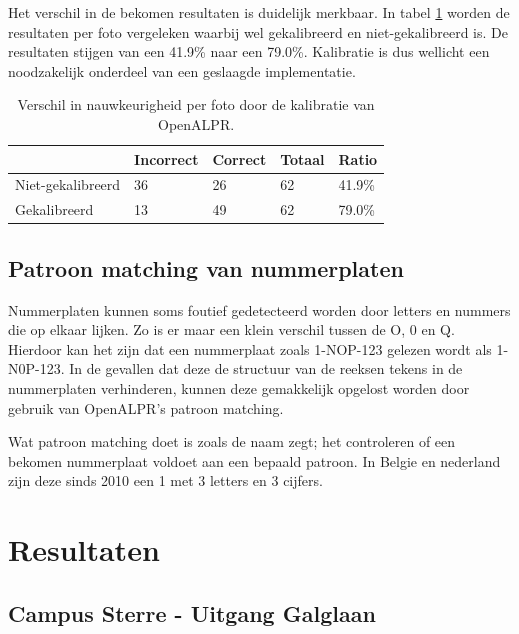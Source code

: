 Het verschil in de bekomen resultaten is duidelijk merkbaar. In tabel \ref{tab:kalibratiealpr} worden de resultaten per foto vergeleken waarbij wel gekalibreerd en niet-gekalibreerd is. De resultaten stijgen van een 41.9\% naar een 79.0\%. Kalibratie is dus wellicht een noodzakelijk onderdeel van een geslaagde implementatie.
\begin{table}[h!]
	\centering
	\begin{tabular}{l|l|l|l|l}
		 		& Incorrect & Correct & Totaal & Ratio	\\ \hline
		Niet-gekalibreerd	& 36 & 26 & 62 & 41.9\%	\\
		Gekalibreerd	& 13 & 49 & 62 & 79.0\%\\
	\end{tabular}
\caption{Verschil in nauwkeurigheid per foto door de kalibratie van OpenALPR.}
\label{tab:kalibratiealpr}
\end{table}

\subsection{Patroon matching van nummerplaten}
Nummerplaten kunnen soms foutief gedetecteerd worden door letters en nummers die op elkaar lijken. Zo is er maar een klein verschil tussen de O, 0 en Q. 
Hierdoor kan het zijn dat een nummerplaat zoals 1-NOP-123 gelezen wordt als 1-N0P-123. In de gevallen dat deze de structuur van de reeksen tekens in de nummerplaten verhinderen, kunnen deze gemakkelijk opgelost worden door gebruik van OpenALPR's patroon matching.

Wat patroon matching doet is zoals de naam zegt; het controleren of een bekomen nummerplaat voldoet aan een bepaald patroon. In Belgie en nederland zijn deze sinds 2010 een 1 met 3 letters en 3 cijfers.

\section{Resultaten}

\subsection{Campus Sterre - Uitgang Galglaan}

